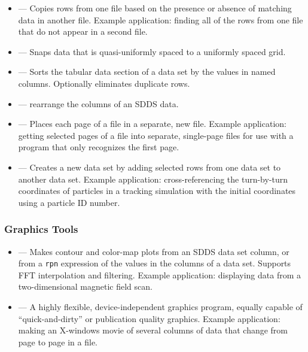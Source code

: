 \documentclass[11pt]{article}
\begin{document}
\begin{itemize}
\item {} --- Copies rows from one file based on the
presence or absence of matching data in another file.  Example
application: finding all of the rows from one file that do not appear
in a second file.

\item {} --- Snaps data that is quasi-uniformly spaced to a uniformly spaced grid.

\item {} --- Sorts the tabular data section of a data set by the values in named columns.
Optionally eliminates duplicate rows.

\item {} --- rearrange the columns of an SDDS data.

\item {} --- Places each page of a file in a separate, new file.  Example application: getting
selected pages of a file into separate, single-page files for use with a program that only recognizes the first
page.

\item {} --- Creates a new data set by adding selected
rows from one data set to another data set.  Example application:
cross-referencing the turn-by-turn coordinates of particles in a
tracking simulation with the initial coordinates using a particle ID
number.

\end{itemize}

\subsubsection{Graphics Tools}

\begin{itemize}

\item {} --- Makes contour and color-map plots from an SDDS data set column, or from a
\verb|rpn| expression of the values in the columns of a data set.  Supports FFT interpolation and filtering.
Example application: displaying data from a two-dimensional magnetic field scan.

\item {} --- A highly flexible, device-independent graphics program, equally capable of
``quick-and-dirty'' or publication quality graphics.  Example application: making an X-windows movie of several
columns of data that change from page to page in a file.

\end{itemize}
\end{document}
